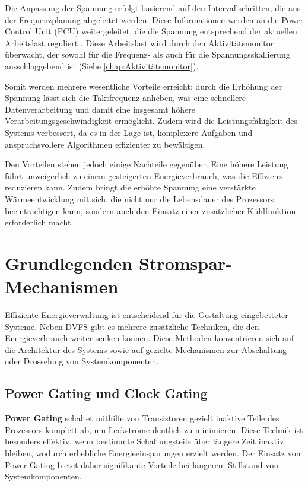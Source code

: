 \documentclass[footmark=none]{tubaf-thesis}
\begin{document}
      	 	Die Anpassung der Spannung erfolgt basierend auf den Intervallschritten, die aus der Frequenzplanung abgeleitet werden. Diese Informationen werden an die Power Control Unit (PCU) weitergeleitet, die die Spannung entsprechend der aktuellen Arbeitslast reguliert \cite{khabi2018energieeffizienz}. Diese Arbeitslast wird durch den Aktivitätsmonitor überwacht, der sowohl für die Frequenz- als auch für die Spannungsskallierung ausschlaggebend ist (Siehe \autoref{chap:Aktivitätsmonitor}).
        
      	 	Somit werden mehrere wesentliche Vorteile erreicht: durch die Erhöhung der Spannung lässt sich die Taktfrequenz anheben, was eine schnellere Datenverarbeitung und damit eine insgesamt höhere Verarbeitungsgeschwindigkeit ermöglicht. Zudem wird die Leistungsfähigkeit des Systems verbessert, da es in der Lage ist, komplexere Aufgaben und anspruchsvollere Algorithmen effizienter zu bewältigen.
        
			Den Vorteilen stehen jedoch einige Nachteile gegenüber. Eine höhere Leistung führt unweigerlich zu einem gesteigerten Energieverbrauch, was die Effizienz reduzieren kann. Zudem bringt die erhöhte Spannung eine verstärkte Wärmeentwicklung mit sich, die nicht nur die Lebensdauer des Prozessors beeinträchtigen kann, sondern auch den Einsatz einer zusätzlicher Kühlfunktion erforderlich macht.
       	
	\chapter{Grundlegenden Stromspar-Mechanismen}
		
		Effiziente Energieverwaltung ist entscheidend für die Gestaltung eingebetteter Systeme. Neben DVFS gibt es mehrere zusätzliche Techniken, die den Energieverbrauch weiter senken können. Diese Methoden konzentrieren sich auf die Architektur des Systems sowie auf gezielte Mechanismen zur Abschaltung oder Drosselung von Systemkomponenten.
		
		\section{Power Gating und Clock Gating}
			\textbf{Power Gating} schaltet mithilfe von Transistoren gezielt inaktive Teile des Prozessors komplett ab, um Leckströme deutlich zu minimieren. Diese Technik ist besonders effektiv, wenn bestimmte Schaltungsteile über längere Zeit inaktiv bleiben, wodurch erhebliche Energieeinsparungen erzielt werden. Der Einsatz von Power Gating bietet daher signifikante Vorteile bei längerem Stillstand von Systemkomponenten. \cite{1198683}
		
\end{document}

